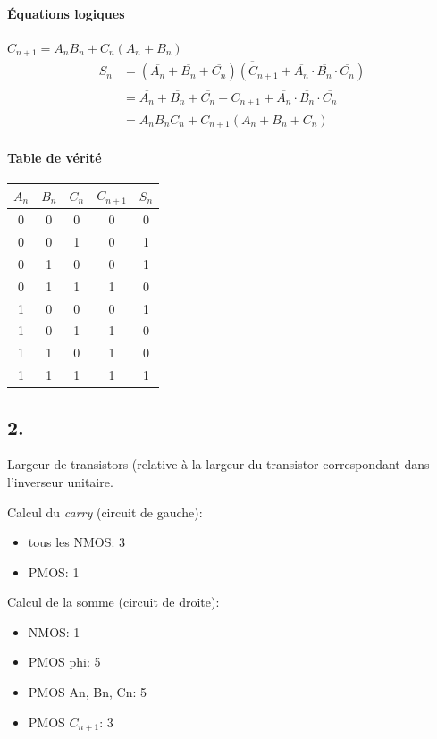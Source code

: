 \documentclass[frenchb,DIV=14]{scrartcl}
\begin{document}
\paragraph{Équations logiques}
$C_{n+1} = A_n B_n + C_n (A_n + B_n)$
\begin{align*}
    S_n &= \overline{(\overline{A_n} + \overline{B_n} + \overline{C_n})(C_{n+1} + \overline{A_n}\cdot\overline{B_n}\cdot\overline{C_n})} \\
    &=  \overline{\overline{A_n}+\overline{B_n}+\overline{C_n}} + \overline{C_{n+1} + \overline{A_n}\cdot\overline{B_n}\cdot\overline{C_n}} \\
    &= A_n B_n C_n + \overline{C_{n+1}}(A_n+B_n+C_n)
\end{align*}

\paragraph{Table de vérité}

\begin{center}
    \begin{tabular}{ccc|cc}
        $A_n$&$B_n$&$C_n$&$C_{n+1}$&$S_n$\\
        \hline
        0&0&0&0&0\\
        0&0&1&0&1\\
        0&1&0&0&1\\
        0&1&1&1&0\\
        1&0&0&0&1\\
        1&0&1&1&0\\
        1&1&0&1&0\\
        1&1&1&1&1
    \end{tabular}
\end{center}

\subsection*{2.}

Largeur de transistors (relative à la largeur du transistor correspondant
dans l'inverseur unitaire.

Calcul du \emph{carry} (circuit de gauche):
\begin{itemize}
    \item tous les NMOS: 3
    \item PMOS: 1
\end{itemize}

Calcul de la somme (circuit de droite):
\begin{itemize}
    \item NMOS: 1
    \item PMOS phi: 5
    \item PMOS An, Bn, Cn: 5
    \item PMOS $C_{n+1}$: 3
\end{itemize}
\end{document}
